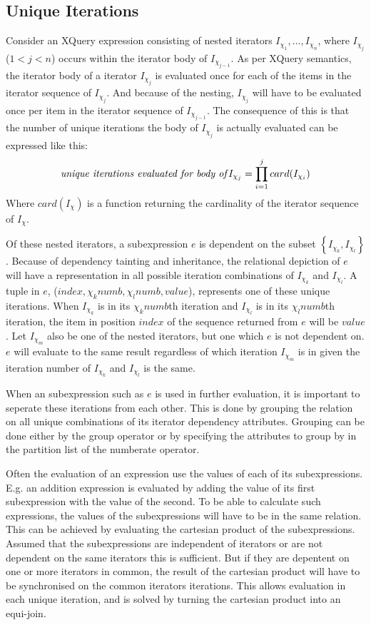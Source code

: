 \subsection{Unique Iterations}
\label{sect:trans:TD:implic}
Consider an XQuery expression consisting of nested iterators $I_{\chi_1},\ldots,I_{\chi_n}$, where $I_{\chi_j}$
($1<j<n$) occurs within the iterator body of $I_{\chi_{j-1}}$. As per XQuery semantics, the iterator body of a
iterator $I_{\chi_j}$ is evaluated once for each of the items in the iterator sequence of $I_{\chi_j}$. And because
of the nesting, $I_{\chi_j}$ will have to be evaluated once per item in the iterator sequence of $I_{\chi_{j-1}}$.
The consequence of this is that the number of unique iterations the body of $I_{\chi_j}$ is actually evaluated can
be expressed like this: 
\begin{equation*}
\mbox{\textit{unique iterations evaluated for body of}}I_{\chi_j}=\displaystyle \prod_{i=1}^{j}card(I_{\chi_i})
\end{equation*}  
Where $card(I_{\chi})$ is a function returning the cardinality of the iterator sequence of $I_{\chi}$.

Of these nested iterators, a subexpression $e$ is dependent on the subset
$\left\{I_{\chi_k},I_{\chi_l}\right\}$. Because of dependency tainting and inheritance, the relational
depiction of $e$ will have a representation in all possible iteration
combinations of $I_{\chi_k}$ and $I_{\chi_l}$. A tuple in $e$, ($index, \chi_k{numb},\chi_l{numb}, value$), represents one of these unique
iterations. When $I_{\chi_k}$ is in its $\chi_k{numb}$th iteration and $I_{\chi_l}$ is in its $\chi_l{numb}$th
iteration, the item in position $index$ of the sequence returned from $e$ will be $value$. Let $I_{\chi_m}$ also
be one of the nested iterators, but one which $e$ is not dependent on. $e$ will evaluate to the same result
regardless of which iteration $I_{\chi_m}$ is in given the iteration number of
$I_{\chi_k}$ and $I_{\chi_l}$ is the same.

When an subexpression such as $e$ is used in further evaluation, it is important to seperate these iterations from
each other. This is done by grouping the relation on all unique combinations of its iterator dependency attributes.
Grouping can be done either by the \textsf{group} operator or by specifying the attributes to group by in the
partition list of the \textsf{numberate} operator.

Often the evaluation of an expression use the values of each of its
subexpressions. E.g. an addition expression is evaluated by adding the value of its first subexpression with the value of the second. To be able to calculate
such expressions, the values of the subexpressions will have to be in the same relation. This can be achieved by
evaluating the cartesian product of the subexpressions. Assumed that the subexpressions are independent of
iterators or are not dependent on the same iterators this is sufficient. But if they are depentent on one or more
iterators in common, the result of the cartesian product will have to be synchronised on the common iterators
iterations. This allows evaluation in each unique iteration, and is solved by turning the cartesian product into
an equi-join.

